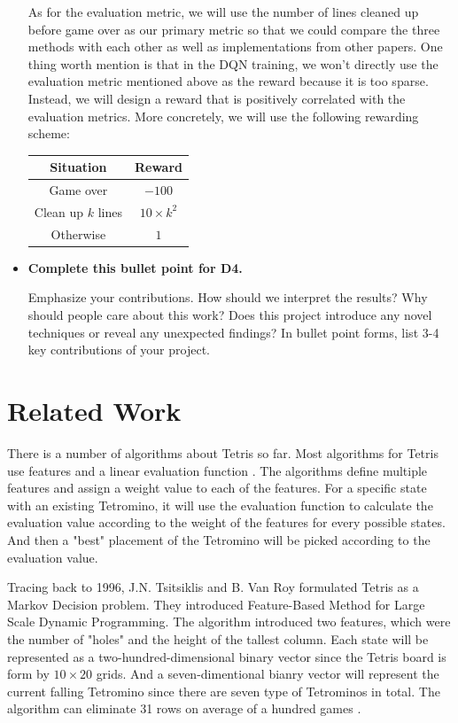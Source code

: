 \documentclass[letterpaper]{article} %
\begin{document}
\begin{itemize}
\begin{itemize}
\end{itemize}
{As for the evaluation metric, we will use the number of lines cleaned up before game over as our primary metric so that we could compare the three methods with each other as well as implementations from other papers. One thing worth mention is that in the DQN training, we won't directly use the evaluation metric mentioned above as the reward because it is too sparse. Instead, we will design a reward that is positively correlated with the evaluation metrics. More concretely, we will use the following rewarding scheme:}
\begin{center}
  \begin{tabular}{ |c|c| } 
  \hline
  Situation & Reward  \\ 
  \hline
   Game over & $-100$  \\ 
   \hline
   Clean up $k$ lines & $10\times k^{2}$  \\ 
   \hline
   Otherwise & $1$  \\
   \hline
  \end{tabular}
\end{center}

\item 
{\bf Complete this bullet point for D4.}

Emphasize your contributions.  How should we interpret the results?  Why should people care about this work?   Does this project introduce any novel techniques or reveal any unexpected findings?  In bullet point forms, list 3-4 key contributions of your project.

\end{itemize}


\section{Related Work} 

There is a number of algorithms about Tetris so far. Most algorithms for Tetris use features and a linear evaluation function \cite{SO19}. The algorithms define multiple features and assign a weight value to each of the features. For a specific state with an existing Tetromino, it will use the evaluation function to calculate the evaluation value according to the weight of the features for every possible states. And then a "best" placement of the Tetromino will be picked according to the evaluation value.

Tracing back to 1996, J.N. Tsitsiklis and B. Van Roy formulated Tetris as a Markov Decision problem. They introduced Feature-Based Method for Large Scale Dynamic Programming. The algorithm introduced two features, which were the number of "holes" and the height of the tallest column. Each state will be represented as a two-hundred-dimensional binary vector since the Tetris board is form by $10 \times 20$ grids. And a seven-dimentional bianry vector will represent the current falling Tetromino since there are seven type of Tetrominos in total. The algorithm can eliminate 31 rows on average of a hundred games \cite{TV96}.
\end{document}
